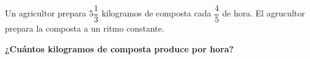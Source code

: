 Un agricultor prepara $5\dfrac{1}{3}$ kilogramos de composta cada $\dfrac{4}{5}$ de hora. El agrucultor prepara la composta a un ritmo constante.

\textbf{¿Cuántos kilogramos de composta produce por hora?}


\begin{solutionbox}{1.5cm}

\end{solutionbox}